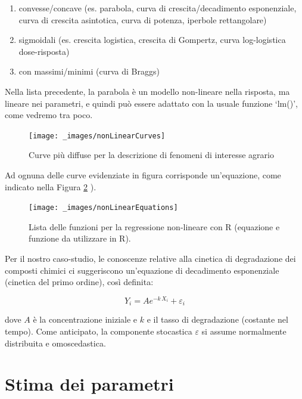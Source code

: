 \documentclass[a4paper,12pt,oneside]{book}
\providecommand{\tightlist}{%
  \setlength{\itemsep}{0pt}\setlength{\parskip}{0pt}}
\begin{document}
\begin{enumerate}
\def\labelenumi{\arabic{enumi}.}
\tightlist
\item
  convesse/concave (es. parabola, curva di crescita/decadimento esponenziale, curva di crescita asintotica, curva di potenza, iperbole rettangolare)
\item
  sigmoidali (es. crescita logistica, crescita di Gompertz, curva log-logistica dose-risposta)
\item
  con massimi/minimi (curva di Braggs)
\end{enumerate}

Nella lista precedente, la parabola è un modello non-lineare nella risposta, ma lineare nei parametri, e quindi può essere adattato con la usuale funzione `lm()', come vedremo tra poco.

\begin{figure}

{\centering \texttt{[image: \_images/nonLinearCurves]} 

}

\caption{Curve più diffuse per la descrizione di fenomeni di interesse agrario}\label{fig:figName151b}
\end{figure}

Ad ognuna delle curve evidenziate in figura corrisponde un'equazione, come indicato nella Figura \ref{fig:figName151bis} ).

\begin{figure}

{\centering \texttt{[image: \_images/nonLinearEquations]} 

}

\caption{Lista delle funzioni per la regressione non-lineare con R (equazione e funzione da utilizzare in R).}\label{fig:figName151bis}
\end{figure}

Per il nostro caso-studio, le conoscenze relative alla cinetica di degradazione dei composti chimici ci suggeriscono un'equazione di decadimento esponenziale (cinetica del primo ordine), così definita:

\[Y_i = A e^{-k \,X_i} + \varepsilon_i\]

dove \(A\) è la concentrazione iniziale e \(k\) e il tasso di degradazione (costante nel tempo). Come anticipato, la componente stocastica \(\varepsilon\) si assume normalmente distribuita e omoscedastica.

\hypertarget{stima-dei-parametri-3}{%
\section{Stima dei parametri}\label{stima-dei-parametri-3}}
\end{document}
